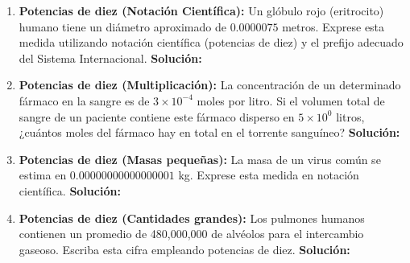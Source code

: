 \documentclass[12pt,letterpaper]{article}
\begin{document}
\begin{enumerate}
    \item \textbf{Potencias de diez (Notación Científica):} Un glóbulo rojo (eritrocito) humano tiene un diámetro aproximado de $0.0000075$ metros. Exprese esta medida utilizando notación científica (potencias de diez) y el prefijo adecuado del Sistema Internacional.
    \textbf{Solución:} \\

    \item \textbf{Potencias de diez (Multiplicación):} La concentración de un determinado fármaco en la sangre es de $3 \times 10^{-4}$ moles por litro. Si el volumen total de sangre de un paciente contiene este fármaco disperso en $5 \times 10^0$ litros, ¿cuántos moles del fármaco hay en total en el torrente sanguíneo?
    \textbf{Solución:} \\

    \item \textbf{Potencias de diez (Masas pequeñas):} La masa de un virus común se estima en $0.00000000000000001$ kg. Exprese esta medida en notación científica.
    \textbf{Solución:} \\

    \item \textbf{Potencias de diez (Cantidades grandes):} Los pulmones humanos contienen un promedio de 480,000,000 de alvéolos para el intercambio gaseoso. Escriba esta cifra empleando potencias de diez.
    \textbf{Solución:} \\

\end{enumerate}
\end{document}
